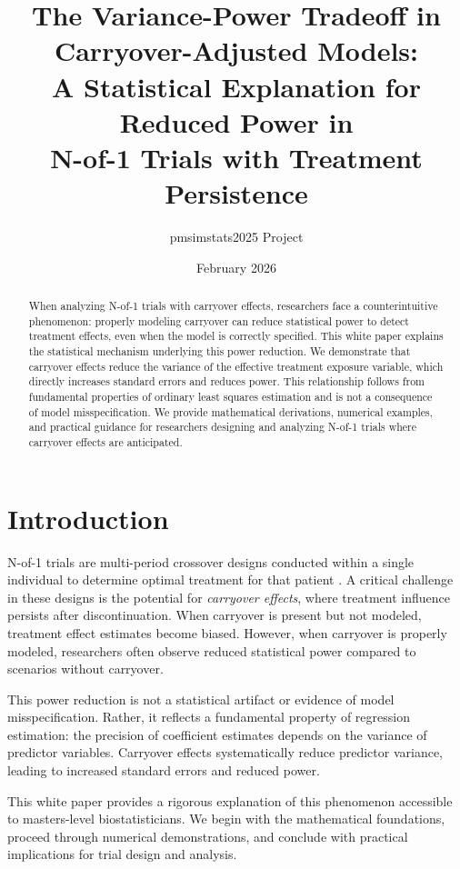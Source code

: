 \documentclass[11pt,letterpaper]{article}
\title{The Variance-Power Tradeoff in Carryover-Adjusted Models:\\
       A Statistical Explanation for Reduced Power in\\
       N-of-1 Trials with Treatment Persistence}
\author{pmsimstats2025 Project}
\date{February 2026}
\begin{document}
\maketitle

\begin{abstract}
When analyzing N-of-1 trials with carryover effects, researchers face a
counterintuitive phenomenon: properly modeling carryover can reduce statistical
power to detect treatment effects, even when the model is correctly specified.
This white paper explains the statistical mechanism underlying this power
reduction. We demonstrate that carryover effects reduce the variance of the
effective treatment exposure variable, which directly increases standard errors
and reduces power. This relationship follows from fundamental properties of
ordinary least squares estimation and is not a consequence of model
misspecification. We provide mathematical derivations, numerical examples, and
practical guidance for researchers designing and analyzing N-of-1 trials where
carryover effects are anticipated.
\end{abstract}

\section{Introduction}

N-of-1 trials are multi-period crossover designs conducted within a single
individual to determine optimal treatment for that patient
\citep{lillie2011n}. A critical challenge in these designs is the potential
for \emph{carryover effects}, where treatment influence persists after
discontinuation. When carryover is present but not modeled, treatment effect
estimates become biased. However, when carryover is properly modeled,
researchers often observe reduced statistical power compared to scenarios
without carryover.

This power reduction is not a statistical artifact or evidence of model
misspecification. Rather, it reflects a fundamental property of regression
estimation: the precision of coefficient estimates depends on the variance of
predictor variables. Carryover effects systematically reduce predictor
variance, leading to increased standard errors and reduced power.

This white paper provides a rigorous explanation of this phenomenon accessible
to masters-level biostatisticians. We begin with the mathematical foundations,
proceed through numerical demonstrations, and conclude with practical
implications for trial design and analysis.
\end{document}
